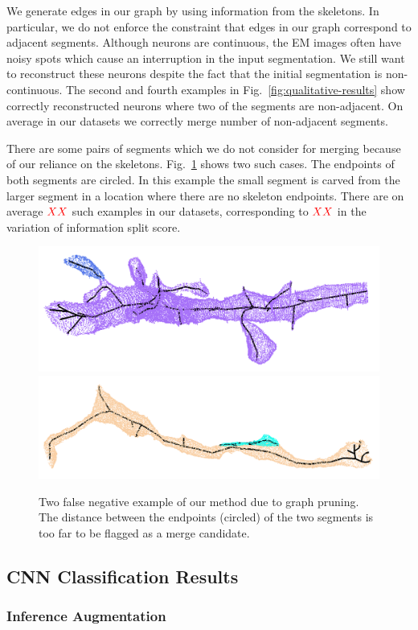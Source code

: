 We generate edges in our graph by using information from the skeletons. 
In particular, we do not enforce the constraint that edges in our graph correspond to adjacent segments.
Although neurons are continuous, the EM images often have noisy spots which cause an interruption in the input segmentation.
We still want to reconstruct these neurons despite the fact that the initial segmentation is non-continuous. 
The second and fourth examples in Fig.~\ref{fig:qualitative-results} show correctly reconstructed neurons where two of the segments are non-adjacent. 
On average in our datasets we correctly merge  number of non-adjacent segments. 

There are some pairs of segments which we do not consider for merging because of our reliance on the skeletons.
Fig.~\ref{fig:skeleton-results} shows two such cases. 
The endpoints of both segments are circled.
In this example the small segment is carved from the larger segment in a location where there are no skeleton endpoints. 
There are on average $\textcolor{red}{XX}$ such examples in our datasets, corresponding to $\textcolor{red}{XX}$ in the variation of information split score. 

\begin{figure}[t!]
	\centering
	\includegraphics[width=0.45\linewidth]{./figures/merge_candidate1.png}		\includegraphics[width=0.45\linewidth]{./figures/merge_candidate2.png}
	\caption{Two false negative example of our method due to graph pruning. The distance between the endpoints (circled) of the two segments is too far to be flagged as a merge candidate.}
	\label{fig:skeleton-results}
\end{figure}

\subsection{CNN Classification Results}

\subsubsection{Inference Augmentation}

